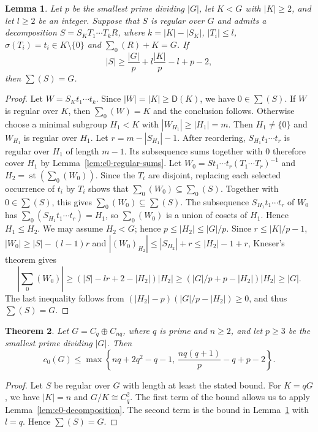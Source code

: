 \documentclass[10pt,reqno]{amsart}
\newtheorem{thm}{Theorem} [section]
\newtheorem{lem}[thm]{Lemma}
\theoremstyle{definition}
\theoremstyle{remark}
\numberwithin{equation}{section}
\DeclareMathOperator{\st}{st}
\begin{document}
\begin{lem}\label{lem:c0-KneserW0}
Let $p$ be the smallest prime dividing $|G|$, let $K<G$ with $|K|\ge2$, and let $l\ge2$ be an integer.
Suppose that $S$ is regular over $G$ and admits a decomposition
$S=S_KT_1\cdots T_kR$, where $k=|K|-|S_K|$,
$|T_i|\le l$, $\sigma(T_i)=t_i\in K\setminus\{0\}$ and $\sum_0(R)+K=G$.
If
\[
|S|\ge\frac{|G|}{p}+l\frac{|K|}{p}-l+p-2,
\]
then $\sum(S)=G$.
\end{lem}

\begin{proof}
Let $W=S_Kt_1\cdots t_k$. Since $|W|=|K|\ge \mathsf D(K)$, we have $0\in\sum(S)$.
If $W$ is regular over $K$, then $\sum_0(W)=K$ and the conclusion follows.
Otherwise choose a minimal subgroup $H_1<K$ with $|W_{H_1}|\ge|H_1|=m$.
Then $H_1\ne\{0\}$ and $W_{H_1}$ is regular over $H_1$.
Let $r=m-|S_{H_1}|-1$.
After reordering, $S_{H_1}t_1\cdots t_r$ is regular over $H_1$ of length $m-1$.
Its subsequence sums together with $0$ therefore cover $H_1$ by Lemma~\ref{lem:c0-regular-sums}.
Let $W_0=St_1\cdots t_r(T_1\cdots T_r)^{-1}$ and $H_2=\st(\sum_0(W_0))$.
Since the $T_i$ are disjoint, replacing each selected occurrence of
$t_i$ by $T_i$ shows that $\sum_0(W_0)\subseteq\sum_0(S)$.
Together with $0\in\sum(S)$, this gives $\sum_0(W_0)\subseteq\sum(S)$.
The subsequence $S_{H_1}t_1\cdots t_r$ of $W_0$ has
$\sum_0(S_{H_1}t_1\cdots t_r)=H_1$, so $\sum_0(W_0)$ is a union
of cosets of $H_1$. Hence $H_1\le H_2$.
We may assume $H_2<G$; hence $p\le|H_2|\le|G|/p$.
Since $r\le|K|/p-1$, $|W_0|\ge|S|-(l-1) r$ and
$|(W_0)_{H_2}|\le|S_{H_2}|+r\le|H_2|-1+r$, Kneser's theorem gives
\[
|\sum_0(W_0)|\ge(|S|-lr+2-|H_2|)|H_2|
\ge(|G|/p+p-|H_2|)|H_2|\ge|G|.
\]
The last inequality follows from $(|H_2|-p)(|G|/p-|H_2|)\ge0$, and thus $\sum(S)=G$.
\end{proof}

\begin{thm}\label{thm:unified-c0}
Let $G=C_q\oplus C_{nq}$, where $q$ is prime and $n\ge2$,
and let $p\ge3$ be the smallest prime dividing $|G|$. Then
\[
c_0(G)\le
\max\left\{nq+2q^2-q-1,\,
\frac{nq(q+1)}p-q+p-2\right\}.
\]
\end{thm}

\begin{proof}
Let $S$ be regular over $G$ with length at least the stated bound.
For $K=qG$, we have $|K|=n$ and $G/K\cong C_q^2$.
The first term of the bound allows us to apply Lemma~\ref{lem:c0-decomposition}.
The second term is the bound in Lemma~\ref{lem:c0-KneserW0} with $l=q$.
Hence $\sum(S)=G$.
\end{proof}
\end{document}

